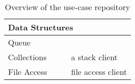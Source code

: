 \begin{table}
\begin{center}
\begin{tabular}{|l|l|l|l|}
	\hline
	\multicolumn{4}{|l|}{ \textbf{Data Structures}}
	\\
	\hline
	Queue & \cite{Queue} & \Sill &
	\\
	Collections & \cite{Stack} & \TypeState  & a stack client
	\\
	File Access & \cite{FileAccess} & \TypeState & file access client
	\\
	\hline
\end{tabular}
\end{center}
\caption{Overview of the use-case repository }
\label{table:use_cases_all}
\end{table}

